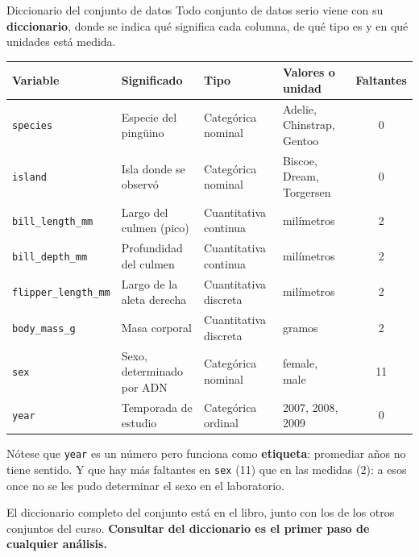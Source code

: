 \documentclass[aspectratio=169,10pt]{beamer}
\newcommand{\destaca}[1]{%
  \par\vspace{3pt}\noindent
  \colorbox{azulClaro}{%
    \parbox{\dimexpr\linewidth-2\fboxsep\relax}{\vspace{3pt}#1\vspace{3pt}}}%
  \par\vspace{3pt}}
\begin{document}
\begin{frame}{Diccionario del conjunto de datos}
  Todo conjunto de datos serio viene con su \textbf{diccionario}, donde se indica qué significa cada
  columna, de qué tipo es y en qué unidades está medida.
  
  \vspace{0.3cm}
  \centering
  {\scriptsize
  \begin{tabular}{@{}llllc@{}}
    \toprule
    \textbf{Variable} & \textbf{Significado} & \textbf{Tipo} & \textbf{Valores o unidad} & \textbf{Faltantes} \\
    \midrule
    \texttt{species}    & Especie del pingüino & Categórica nominal & Adelie, Chinstrap, Gentoo & 0 \\
    \texttt{island}     & Isla donde se observó & Categórica nominal & Biscoe, Dream, Torgersen & 0 \\
    \texttt{bill\_length\_mm} & Largo del culmen (pico) & Cuantitativa continua & milímetros & 2 \\
    \texttt{bill\_depth\_mm}  & Profundidad del culmen & Cuantitativa continua & milímetros & 2 \\
    \texttt{flipper\_length\_mm} & Largo de la aleta derecha & Cuantitativa discreta & milímetros & 2 \\
    \texttt{body\_mass\_g}    & Masa corporal & Cuantitativa discreta & gramos & 2 \\
    \texttt{sex}        & Sexo, determinado por ADN & Categórica nominal & female, male & 11 \\
    \texttt{year}       & Temporada de estudio & Categórica ordinal & 2007, 2008, 2009 & 0 \\
    \bottomrule
  \end{tabular}}
  \vspace{0.4cm}
  \raggedright
  \destaca{\small Nótese que \texttt{year} es un número pero funciona como \textbf{etiqueta}:
  promediar años no tiene sentido. Y que hay más faltantes en \texttt{sex} (11) que en las
  medidas (2): a esos once no se les pudo determinar el sexo en el laboratorio.
  
  \vspace{0.2cm}
  El diccionario completo del conjunto está en el libro, junto con los de los otros
  conjuntos del curso. \textbf{Consultar del diccionario es el primer paso de cualquier análisis.}}
\end{frame}
\end{document}
